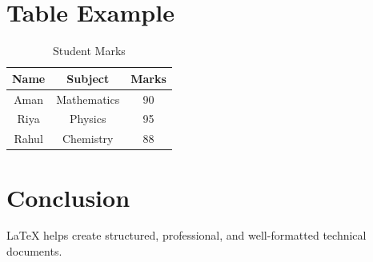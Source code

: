 \documentclass[12pt,a4paper]{article}
\begin{document}
\section{Table Example}

\begin{table}[h]
\centering
\caption{Student Marks}
\begin{tabular}{ccc}
\toprule
Name & Subject & Marks \\
\midrule
Aman & Mathematics & 90 \\
Riya & Physics & 95 \\
Rahul & Chemistry & 88 \\
\bottomrule
\end{tabular}
\end{table}

\section{Conclusion}

LaTeX helps create structured, professional,
and well-formatted technical documents.
\end{document}
